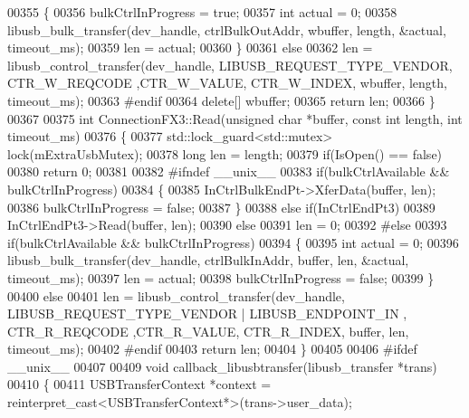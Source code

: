 \begin{DoxyCode}
{{00355     \{
00356         bulkCtrlInProgress = \textcolor{keyword}{true};
00357         \textcolor{keywordtype}{int} actual = 0;
00358         libusb\_bulk\_transfer(dev\_handle, ctrlBulkOutAddr, wbuffer, length, &actual, timeout\_ms);
00359         len = actual;
00360     \}
00361     \textcolor{keywordflow}{else}
00362         len = libusb\_control\_transfer(dev\_handle, LIBUSB\_REQUEST\_TYPE\_VENDOR,
      CTR_W_REQCODE ,CTR_W_VALUE, CTR_W_INDEX, wbuffer, length, timeout\_ms);
00363 \textcolor{preprocessor}{    #endif}
00364     \textcolor{keyword}{delete}[] wbuffer;
00365     \textcolor{keywordflow}{return} len;
00366 \}
00367 
00375 \textcolor{keywordtype}{int} ConnectionFX3::Read(\textcolor{keywordtype}{unsigned} \textcolor{keywordtype}{char} *buffer, \textcolor{keyword}{const} \textcolor{keywordtype}{int} length, \textcolor{keywordtype}{int} timeout_ms)
00376 \{
00377     std::lock\_guard<std::mutex> lock(mExtraUsbMutex);
00378     \textcolor{keywordtype}{long} len = length;
00379     \textcolor{keywordflow}{if}(IsOpen() == \textcolor{keyword}{false})
00380         \textcolor{keywordflow}{return} 0;
00381 
00382 \textcolor{preprocessor}{#ifndef \_\_unix\_\_}
00383     \textcolor{keywordflow}{if}(bulkCtrlAvailable && bulkCtrlInProgress)
00384     \{
00385         InCtrlBulkEndPt->XferData(buffer, len);
00386         bulkCtrlInProgress = \textcolor{keyword}{false};
00387     \}
00388     \textcolor{keywordflow}{else} \textcolor{keywordflow}{if}(InCtrlEndPt3)
00389         InCtrlEndPt3->Read(buffer, len);
00390     \textcolor{keywordflow}{else}
00391         len = 0;
00392 \textcolor{preprocessor}{#else}
00393     \textcolor{keywordflow}{if}(bulkCtrlAvailable && bulkCtrlInProgress)
00394     \{
00395         \textcolor{keywordtype}{int} actual = 0;
00396         libusb\_bulk\_transfer(dev\_handle, ctrlBulkInAddr, buffer, len, &actual, timeout\_ms);
00397         len = actual;
00398         bulkCtrlInProgress = \textcolor{keyword}{false};
00399     \}
00400     \textcolor{keywordflow}{else}
00401         len = libusb\_control\_transfer(dev\_handle, LIBUSB\_REQUEST\_TYPE\_VENDOR | LIBUSB\_ENDPOINT\_IN ,
      CTR_R_REQCODE ,CTR_R_VALUE, CTR_R_INDEX, buffer, len, timeout\_ms);
00402 \textcolor{preprocessor}{#endif}
00403     \textcolor{keywordflow}{return} len;
00404 \}
00405 
00406 \textcolor{preprocessor}{#ifdef \_\_unix\_\_}
00407 
00409 \textcolor{keywordtype}{void} callback\_libusbtransfer(libusb\_transfer *trans)
00410 \{
00411     USBTransferContext *context = \textcolor{keyword}{reinterpret\_cast<}USBTransferContext*\textcolor{keyword}{>}(trans->user\_data);
}}
\end{DoxyCode}
